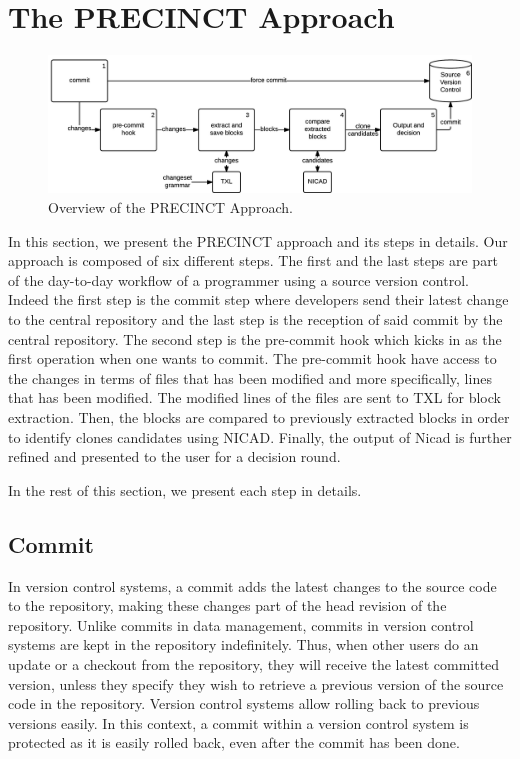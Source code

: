 \documentclass[conference]{IEEEtran}
\begin{document}
\cite{Lague}


\section{The PRECINCT Approach}
\label{sec:The PRECINCT Approach}

\begin{figure}
  \centering
    \includegraphics[width=\textwidth]{media/approach.png}
    \caption{ Overview of the PRECINCT Approach.\label{fig:precinct-approach}}
\end{figure}

In this section, we present the PRECINCT approach and its steps in details. Our approach is composed of six different steps.
The first and the last steps are part of the day-to-day workflow of a programmer using a source version control.
Indeed the first step is the commit step where developers send their latest change to the central repository and the last step is the reception of said commit by the central repository.
The second step is the pre-commit hook which kicks in as the first operation when one wants to commit.
The pre-commit hook have access to the changes in terms of files that has been modified and more specifically, lines that has been modified.
The modified lines of the files are sent to TXL\cite{Cordy2006a} for block extraction.
Then, the blocks are compared to previously extracted blocks in order to identify clones candidates using NICAD\cite{Cordy2011}.
Finally, the output of Nicad is further refined and presented to the user for a decision round.

In the rest of this section, we present each step in details.

\subsection{Commit}
\label{sub:Commit}

In version control systems, a commit adds the latest changes to the source code to the repository, making these changes part of the head revision of the repository.
Unlike commits in data management, commits in version control systems are kept in the repository indefinitely.
Thus, when other users do an update or a checkout from the repository, they will receive the latest committed version, unless they specify they wish to retrieve a previous version of the source code in the repository.
Version control systems allow rolling back to previous versions easily. In this context, a commit within a version control system is protected as it is easily rolled back, even after the commit has been done.
\end{document}
